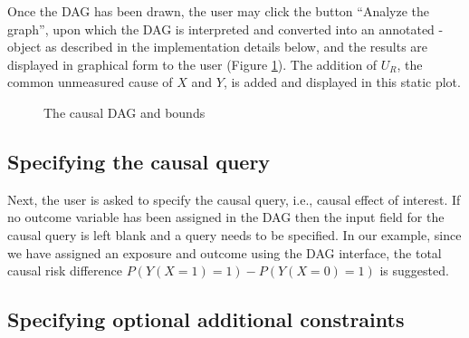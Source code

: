 Once the DAG has been drawn, the user may click the button ``Analyze the graph'', upon which the DAG is interpreted and converted into an annotated -object \citep{igraph} as described in the implementation details below, and the results are displayed in graphical form to the user (Figure \ref{fig:causalDAG}). The addition of \(U_R\), the common unmeasured cause of \(X\) and \(Y\), is added and displayed in this static plot.

\begin{figure}
\caption{The causal DAG and bounds}\label{fig:causalDAG}
\end{figure}

\hypertarget{specifying-the-causal-query}{%
\subsection{Specifying the causal query}\label{specifying-the-causal-query}}

Next, the user is asked to specify the causal query, i.e., causal effect of interest.
If no outcome variable has been assigned in the DAG then the input field for the causal query is left blank and a query needs to be specified. In our example, since we have assigned an exposure and outcome using the DAG interface, the total causal risk difference \(P(Y(X=1)=1)-P(Y(X=0)=1)\) is suggested.

\hypertarget{specifying-optional-additional-constraints}{%
\subsection{Specifying optional additional constraints}\label{specifying-optional-additional-constraints}}

